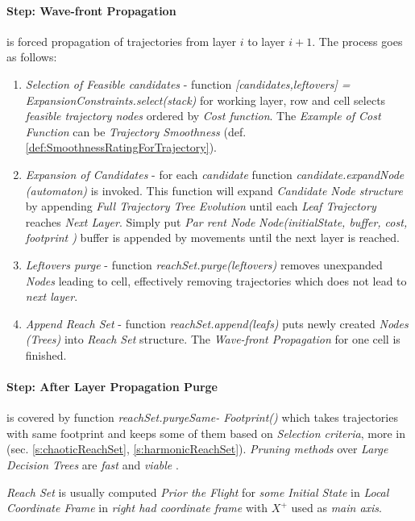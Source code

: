 \paragraph{Step: Wave-front Propagation} is forced propagation of trajectories from layer $i$ to layer $i+1$. The process goes as follows:
\begin{enumerate}
    \item \emph{Selection of Feasible candidates} - function \emph{[candidates,leftovers] = ExpansionConstraints.select(stack)} for working layer, row and cell selects \emph{feasible trajectory nodes} ordered by \emph{Cost function}. The \emph{Example of Cost Function} can be \emph{Trajectory Smoothness} (def. \ref{def:SmoothnessRatingForTrajectory}).
    
    \item \emph{Expansion of Candidates} - for each \emph{candidate} function \emph{candidate.expandNode (automaton)} is invoked. This function will expand \emph{Candidate Node structure} by appending \emph{Full Trajectory Tree Evolution} until each \emph{Leaf Trajectory} reaches \emph{Next Layer}. Simply put \emph{Par rent Node} \emph{Node(initialState, buffer, cost, footprint )} buffer is appended by movements until the next layer is reached.
    
    \item \emph{Leftovers purge} - function \emph{reachSet.purge(leftovers)} removes unexpanded \emph{Nodes} leading to cell, effectively  removing trajectories which does not  lead to \emph{next layer}.
    
    \item \emph{Append Reach Set} - function \emph{reachSet.append(leafs)} puts newly created \emph{Nodes (Trees)} into \emph{Reach Set} structure. The \emph{Wave-front Propagation} for one cell is finished.
\end{enumerate}

\paragraph{Step: After Layer Propagation Purge} is covered by function \emph{reachSet.purgeSame- Footprint()} which takes trajectories with same footprint and keeps some of them based on \emph{Selection criteria}, more in (sec. \ref{s:chaoticReachSet}, \ref{s:harmonicReachSet}). \emph{Pruning methods} over \emph{Large Decision Trees} are \emph{fast} and \emph{viable} \cite{mingers1989empirical}.

\begin{note}
    \emph{Reach Set} is usually computed \emph{Prior the Flight} for \emph{some Initial State} in \emph{Local Coordinate Frame} in \emph{right had coordinate frame} with $X^+$ used as \emph{main axis}.
\end{note}



